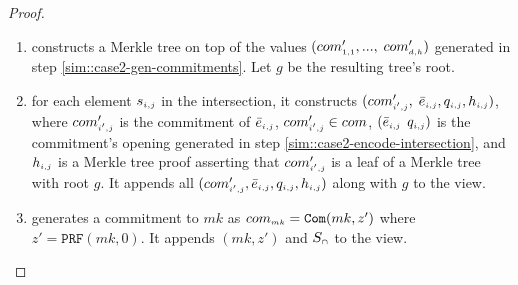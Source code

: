 \begin{proof}
\begin{enumerate}
 
 
 
 
% 
%
 
 
 
 \item constructs a  Merkle tree on top of the values $(com'_{\scriptscriptstyle 1,1}, ..., $ $com'_{\scriptscriptstyle d, h})$ generated in step \ref{sim::case2-gen-commitments}. Let $g$ be the resulting tree's root.  
 \item for each element $s_{\scriptscriptstyle i,j}$ in the intersection, it constructs $(com'_{\scriptscriptstyle i',j}, $ $ \bar{e}_{\scriptscriptstyle i,j}, q_{\scriptscriptstyle i,j}, h_{\scriptscriptstyle i,j})$, where $com'_{\scriptscriptstyle i',j}$ is the commitment of $ \bar{e}_{\scriptscriptstyle i,j}$, $com'_{\scriptscriptstyle i',j}\in com$,  $(\bar{e}_{\scriptscriptstyle i,j}$ $q_{\scriptscriptstyle i,j})$ is the commitment's opening generated in step \ref{sim::case2-encode-intersection}, and $h_{\scriptscriptstyle i,j}$ is a Merkle tree proof asserting that $com'_{\scriptscriptstyle i',j}$ is a leaf of a Merkle tree with root $g$. It appends all  $(com'_{\scriptscriptstyle i',j}, \bar{e}_{\scriptscriptstyle i,j}, q_{\scriptscriptstyle i,j}, h_{\scriptscriptstyle i,j})$ along with $g$ to the view. 
 
\item generates a commitment to $mk$ as $com_{\scriptscriptstyle mk}=\mathtt{Com}(mk, z')$ where $z'=\mathtt{PRF}(mk, 0)$. It appends $(mk, z')$  and  $S_{\scriptscriptstyle \cap}$ to the view. 


\end{enumerate}
\end{proof}
